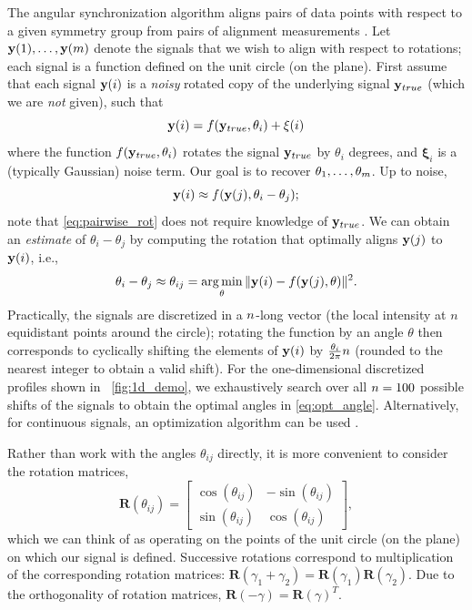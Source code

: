 The angular synchronization algorithm aligns pairs of data points with respect to a given symmetry group from pairs of alignment measurements \citep{singer2011angular}.
%
Let $ \mathbf{y}(1), \dots, \mathbf{y}(m)$ denote the signals that we wish to align with respect to rotations;
each signal is a function defined on the unit circle (on the plane).
%
First assume that each signal $\mathbf{y}(i)$ is a {\it noisy} rotated copy of the underlying signal $\mathbf{y}_{true}$
(which we are {\it not} given), such that
\begin{equation}
\mathbf{y}(i) = f(\mathbf{y}_{true}, \theta_i) + \mathbf{\xi}(i)
\end{equation}
where the function $f(\mathbf{y}_{true}, \theta_i)$ rotates the signal $\mathbf{y}_{true}$ by $\theta_i$ degrees, and $\mathbf{\xi}_i$ is a (typically Gaussian) noise term.
%
Our goal is to recover $\theta_1, \dots, \theta_m$.
%
Up to noise,
\begin{equation} \label{eq:pairwise_rot}
\mathbf{y}(i) \approx f(\mathbf{y}(j), \theta_i - \theta_j) ;
\end{equation}
note that \eqref{eq:pairwise_rot} does not require knowledge of $\mathbf{y}_{true}$.
%
We can obtain an {\it estimate} of $\theta_i - \theta_j$ by computing the rotation that optimally aligns $\mathbf{y}(j)$ to $\mathbf{y}(i)$,
i.e., %
%
\begin{equation} \label{eq:opt_angle}
\theta_i - \theta_j \approx \theta_{ij} = \operatorname*{arg\,min}_{\theta} \|\mathbf{y}(i) - f(\mathbf{y}(j), \theta)\|^2.
\end{equation}
%
Practically, the signals are discretized in a $n$-long vector (the local intensity at $n$ equidistant points around the circle);
rotating the function by an angle $\theta$ then corresponds to cyclically shifting the elements of $\mathbf{y}(i)$
by $\frac{\theta_i}{2 \pi} n$ (rounded to the nearest integer to obtain a valid shift).
%
For the one-dimensional discretized profiles shown in \fig~\ref{fig:1d_demo}, we exhaustively search over all $n=100$ possible shifts of the signals to obtain the optimal angles in \eqref{eq:opt_angle}.
%
Alternatively, for continuous signals, an optimization algorithm
can be used \citep{ahuja2007template}.

Rather than work with the angles $\theta_{ij}$ directly, it is more convenient to consider the rotation matrices,
\begin{equation} \label{eq:R_theta}
\mathbf{R}(\theta_{ij}) = \begin{bmatrix}
\cos(\theta_{ij}) & -\sin(\theta_{ij}) \\
\sin(\theta_{ij}) & \cos(\theta_{ij})
\end{bmatrix},
\end{equation}
which we can think of as operating on the points of the unit circle (on the plane) on which our signal is defined.
%
Successive rotations correspond to multiplication of the corresponding rotation matrices: $\mathbf{R}(\gamma_1 + \gamma_2) = \mathbf{R}(\gamma_1) \mathbf{R}(\gamma_2)$.
%
Due to the orthogonality of rotation matrices, $\mathbf{R}(-\gamma) = \mathbf{R}(\gamma)^T$.

